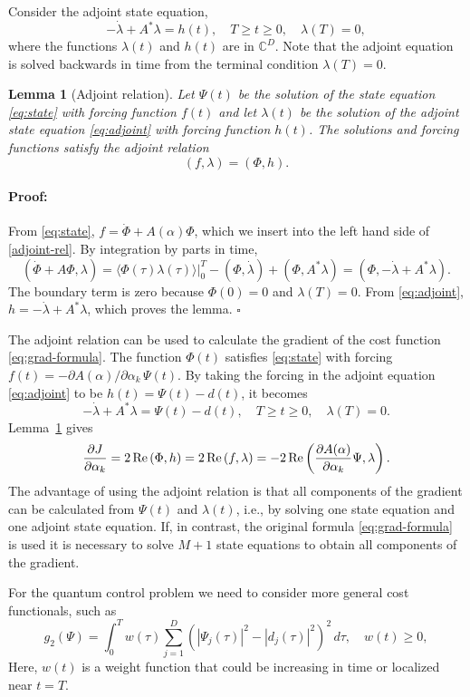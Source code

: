 \documentclass{article}
\newtheorem{lemma}{Lemma}
\begin{document}
Consider the adjoint state equation,
\begin{equation}\label{eq:adjoint}
  -\dot{\lambda} + A^* \lambda = h(t),\quad T\geq t \geq 0,\quad \lambda(T)=0,
\end{equation}
where the functions $\lambda(t)$ and $h(t)$ are in ${\mathbb
  C}^D$. Note that the adjoint equation is solved backwards in time
from the terminal condition $\lambda(T)=0$.
%
\begin{lemma}[Adjoint relation]\label{lem:ad}
  Let $\Psi(t)$ be the solution of the state equation \eqref{eq:state} with forcing function $f(t)$
  and let $\lambda(t)$ be the solution of the adjoint state equation \eqref{eq:adjoint} with forcing
  function $h(t)$. The solutions and forcing functions satisfy the adjoint relation
  \begin{equation}\label{adjoint-rel}
    (f, \lambda) = (\Phi, h).
  \end{equation}
\end{lemma}
%
\paragraph{Proof:}
From \eqref{eq:state}, $f=\dot{\Phi} + A(\alpha) \Phi$, which we insert into the left hand side of
\eqref{adjoint-rel}. By integration by parts in time,
\[
( \dot{\Phi} + A \Phi, \lambda ) = \left.\langle \Phi(\tau)\lambda(\tau)
\rangle\right|_{0}^T - ( \Phi , \dot{\lambda} ) +  ( \Phi, A^* \lambda ) = (\Phi, - \dot{\lambda} +
A^* \lambda).
\]
The boundary term is zero because $\Phi(0)=0$ and $\lambda(T)=0$. From \eqref{eq:adjoint}, $h =
-\dot{\lambda} + A^* \lambda$, which proves the lemma. $\square$

The adjoint relation can be used to calculate the gradient of the cost function
\eqref{eq:grad-formula}. The function $\Phi(t)$ satisfies \eqref{eq:state} with forcing $f(t) = -
\partial A(\alpha)/\partial \alpha_k\,\Psi(t)$. By taking the forcing in the adjoint equation
\eqref{eq:adjoint} to be $h(t) = \Psi(t)- d(t)$, it becomes
\begin{equation}\label{our-adjoint}
-\dot{\lambda} + A^* \lambda = \Psi(t)- d(t),\quad T\geq t \geq 0,\quad \lambda(T)=0.
\end{equation}
Lemma~\ref{lem:ad} gives
\[
\frac{\partial J}{\partial \alpha_k} = 2\, {\rm Re} \left( \Phi, h \right) = 2\, {\rm Re} \left( f,
\lambda \right) = -2\, {\rm Re} \left( \frac{\partial A(\alpha)}{\partial \alpha_k} \Psi, \lambda \right).
\]
The advantage of using the adjoint relation is that all components of the gradient can be calculated
from $\Psi(t)$ and $\lambda(t)$, i.e., by solving one state equation and one adjoint state
equation. If, in contrast, the original formula \eqref{eq:grad-formula} is used it is necessary to
solve $M+1$ state equations to obtain all components of the gradient.

For the quantum control problem we need to consider more general cost functionals, such as
\[
g_2(\Psi) = \int_0^T w(\tau) \sum_{j=1}^D \left( |\Psi_j(\tau)|^2 - |d_j(\tau)|^2 \right)^2\,
d\tau,\quad w(t) \geq 0,
\]
Here, $w(t)$ is a weight function that could be increasing in time or localized near $t=T$.
\end{document}

